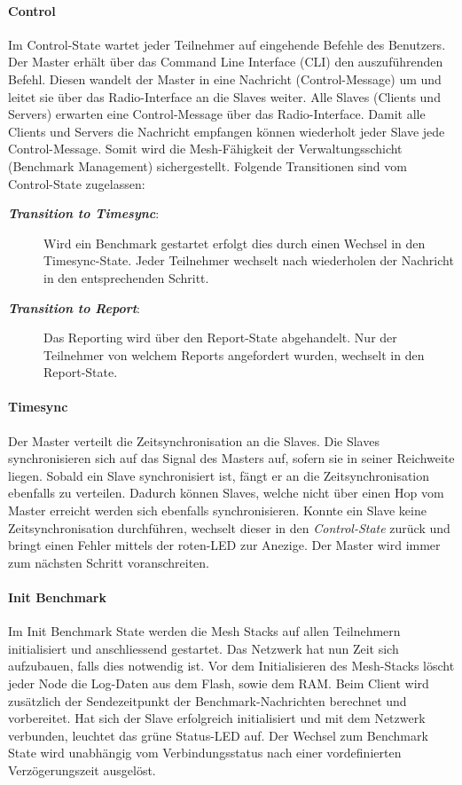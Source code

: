 \paragraph{Control}
	Im Control-State wartet jeder Teilnehmer auf eingehende Befehle des Benutzers. Der Master erhält über das Command Line Interface (CLI) den auszuführenden Befehl.
	Diesen wandelt der Master in eine Nachricht (Control-Message) um und leitet sie über das Radio-Interface an die Slaves weiter. 
	Alle Slaves (Clients und Servers) erwarten eine Control-Message über das Radio-Interface.
	Damit alle Clients und Servers die Nachricht empfangen können wiederholt jeder Slave jede Control-Message.
	Somit wird die Mesh-Fähigkeit der Verwaltungsschicht (Benchmark Management) sichergestellt.
	Folgende Transitionen sind vom Control-State zugelassen: 
\begin{description}
	\item[\textit{\textbf{Transition to Timesync}}:]
	Wird ein Benchmark gestartet erfolgt dies durch einen Wechsel in den Timesync-State. Jeder Teilnehmer wechselt nach wiederholen der Nachricht in den entsprechenden Schritt. 
	\item[\textit{\textbf{Transition to Report}}:]
	Das Reporting wird über den Report-State abgehandelt. Nur der Teilnehmer von welchem Reports angefordert wurden, wechselt in den Report-State. 
\end{description} 	
	
\paragraph{Timesync}
Der Master verteilt die Zeitsynchronisation an die Slaves. Die Slaves synchronisieren sich auf das Signal des Masters auf, sofern sie in seiner Reichweite liegen. Sobald ein Slave synchronisiert ist, fängt er an die Zeitsynchronisation ebenfalls zu verteilen. Dadurch können Slaves, welche nicht über einen Hop vom Master erreicht werden sich ebenfalls synchronisieren. Konnte ein Slave keine Zeitsynchronisation durchführen, wechselt dieser in den  \textit{Control-State} zurück und bringt einen Fehler mittels der roten-LED zur Anezige. Der Master wird immer zum nächsten Schritt voranschreiten. 	

\paragraph{Init Benchmark}
Im Init Benchmark State werden die Mesh Stacks auf allen Teilnehmern initialisiert und anschliessend gestartet.
Das Netzwerk hat nun Zeit sich aufzubauen, falls dies notwendig ist.
Vor dem Initialisieren des Mesh-Stacks löscht jeder Node die Log-Daten aus dem Flash, sowie dem RAM.
Beim Client wird zusätzlich der Sendezeitpunkt der Benchmark-Nachrichten berechnet und vorbereitet.
Hat sich der Slave erfolgreich initialisiert und mit dem Netzwerk verbunden, leuchtet das grüne Status-LED auf.
Der Wechsel zum Benchmark State wird unabhängig vom Verbindungsstatus nach einer vordefinierten Verzögerungszeit ausgelöst.

